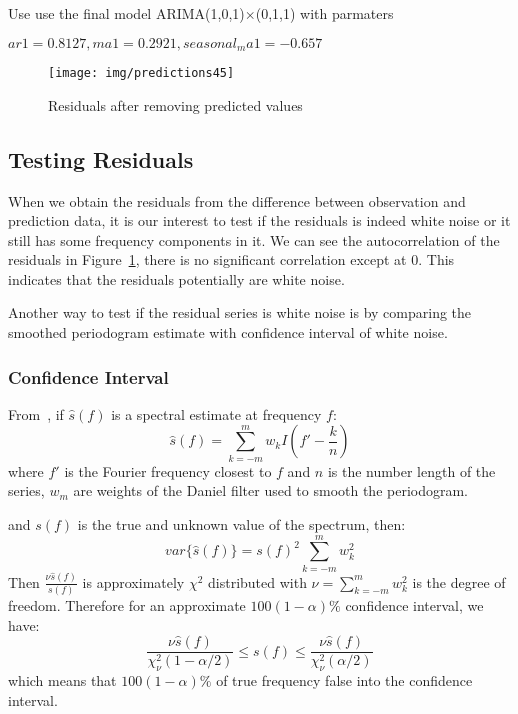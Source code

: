 \documentclass[12pt]{article}
\begin{document}
Use use the final model ARIMA(1,0,1)$\times$(0,1,1) with parmaters  

$ar1=0.8127,ma1=0.2921, seasonal_ma1=-0.657$

\begin{figure}[ht!]
\centering
\texttt{[image: img/predictions45]}
\caption{Residuals after removing predicted values}\label{fig:predictions45}
\end{figure}

\subsection{Testing Residuals}
When we obtain the residuals from the difference between observation and
prediction data, it is our interest to test if the residuals is indeed white
noise or it still has some frequency components in it. We can see the
autocorrelation of the residuals in Figure~\ref{fig:predictions45}, there is no
significant correlation except at 0. This indicates that the residuals
potentially are white noise.

Another way to test if the residual series is white noise is by comparing the
smoothed periodogram estimate with confidence interval of white noise.

\subsubsection{Confidence Interval}
From~\cite{bloomfieldFourierTimeSeries}, if $\hat{s}(f)$ is a spectral estimate
at frequency $f$: 
\begin{equation}
\hat{s}(f)=\sum_{k=-m}^mw_kI(f'-\frac{k}{n})
\end{equation}
where $f'$ is the Fourier frequency closest to $f$ and $n$ is the number length
of the series, $w_m$ are weights of the Daniel filter used to smooth the
periodogram.

and $s(f)$ is the true and unknown value of the spectrum, then:
\begin{equation}
var\{\hat{s}(f)\}=s(f)^2\sum_{k=-m}^mw_k^2
\end{equation}
Then
$\frac{\nu \hat{s}(f)}{s(f)}$ is approximately $\chi^2$ distributed with
$\nu=\sum_{k=-m}^mw_k^2$ is the degree of freedom. Therefore for an approximate
$100(1-\alpha)\%$ confidence interval, we have:
\begin{equation}\label{eqn:confidenceInterval}
\frac{\nu\hat{s}(f)}{\chi_{\nu}^2(1-\alpha/2)}\leq s(f)\leq
\frac{\nu\hat{s}(f)}{\chi_{\nu}^2(\alpha/2)}
\end{equation}
which means that $100(1-\alpha)\%$ of true frequency false into the confidence
interval.
\end{document}
